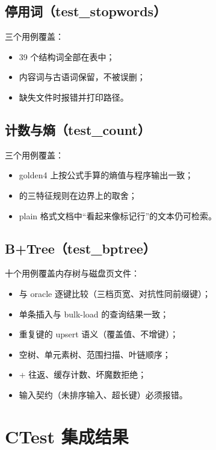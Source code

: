 \subsection{停用词（test\_stopwords）}

三个用例覆盖：

\begin{itemize}
  \item 39 个结构词全部在表中；
  \item 内容词与古语词保留，不被误删；
  \item 缺失文件时报错并打印路径。
\end{itemize}

\subsection{计数与熵（test\_count）}

三个用例覆盖：

\begin{itemize}
  \item golden4 上按公式手算的熵值与程序输出一致；
  \item {} 的三特征规则在边界上的取舍；
  \item plain 格式文档中“看起来像标记行”的文本仍可检索。
\end{itemize}

\subsection{B+Tree（test\_bptree）}

十个用例覆盖内存树与磁盘页文件：

\begin{itemize}
  \item 与  oracle 逐键比较（三档页宽、对抗性同前缀键）；
  \item 单条插入与 bulk-load 的查询结果一致；
  \item 重复键的 upsert 语义（覆盖值、不增键）；
  \item 空树、单元素树、范围扫描、叶链顺序；
  \item {} +  往返、缓存计数、坏魔数拒绝；
  \item 输入契约（未排序输入、超长键）必须报错。
\end{itemize}

\section{CTest 集成结果}

